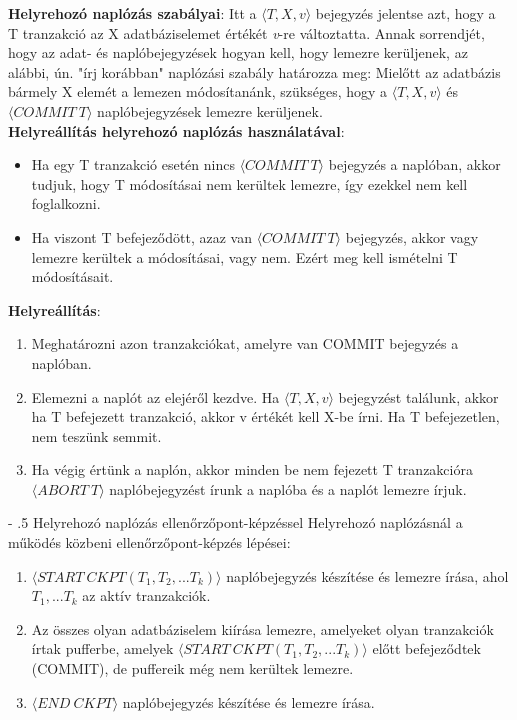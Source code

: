 \documentclass[12pt,margin=0px]{article}
\makeatletter
\renewcommand\paragraph{%
	\@startsection{paragraph}{4}{0mm}%
	{-\baselineskip}%
	{.5\baselineskip}%
	{\normalfont\normalsize\bfseries}}
\makeatother
\begin{document}
	\noindent \textbf{Helyrehozó naplózás szabályai}: Itt a $\langle T,X,v\rangle$ bejegyzés jelentse azt, hogy a \\
    T tranzakció az X adatbáziselemet értékét \emph{v}-re változtatta. Annak sorrendjét, hogy az adat- és naplóbejegyzések hogyan kell, hogy lemezre kerüljenek, az alábbi, ún. "írj korábban"
	naplózási szabály határozza meg: Mielőtt az adatbázis bármely X elemét a lemezen módosítanánk, szükséges, hogy
	a $\langle T,X,v\rangle$ és $\langle COMMIT \ T\rangle$ naplóbejegyzések lemezre kerüljenek.\\
	
	\noindent \textbf{Helyreállítás helyrehozó naplózás használatával}:
    \begin{itemize}
        \item Ha egy T tranzakció esetén nincs $\langle COMMIT \ T\rangle$ bejegyzés a naplóban, akkor tudjuk, hogy T módosításai nem kerültek lemezre, így ezekkel nem kell foglalkozni.
        \item Ha viszont T befejeződött, azaz van $\langle COMMIT \ T\rangle$ bejegyzés, akkor vagy lemezre kerültek a módosításai, vagy nem. Ezért meg kell ismételni T módosításait.
    \end{itemize}
	
	\noindent \textbf{Helyreállítás}:
	\begin{enumerate}
		\item	Meghatározni azon tranzakciókat, amelyre van COMMIT bejegyzés a naplóban.
		\item	Elemezni a naplót az elejéről kezdve. Ha $\langle T,X,v\rangle$ bejegyzést találunk, akkor
		ha T befejezett tranzakció, akkor v értékét kell X-be írni. Ha T befejezetlen, nem teszünk semmit.
		\item	Ha végig értünk a naplón, akkor minden be nem fejezett T tranzakcióra $\langle ABORT \ T\rangle$
		naplóbejegyzést írunk a naplóba és a naplót lemezre írjuk.
	\end{enumerate}
	
	\paragraph{Helyrehozó naplózás ellenőrzőpont-képzéssel}
	Helyrehozó naplózásnál a működés közbeni ellenőrzőpont-képzés lépései:
	\begin{enumerate}
		\item	$\langle START \ CKPT(T_{1},T_{2},...T_{k}) \rangle$ naplóbejegyzés készítése és lemezre írása, ahol
		$T_{1}, ... T_{k}$ az aktív tranzakciók.
		
		\item	Az összes olyan adatbáziselem kiírása lemezre, amelyeket olyan tranzakciók írtak pufferbe, amelyek
		$\langle START \ CKPT(T_{1},T_{2},...T_{k}) \rangle$ előtt befejeződtek (COMMIT), de puffereik még nem kerültek
		lemezre.
		
		\item	$\langle END \ CKPT \rangle$ naplóbejegyzés készítése és lemezre írása.	
	\end{enumerate}
	
\end{document}
